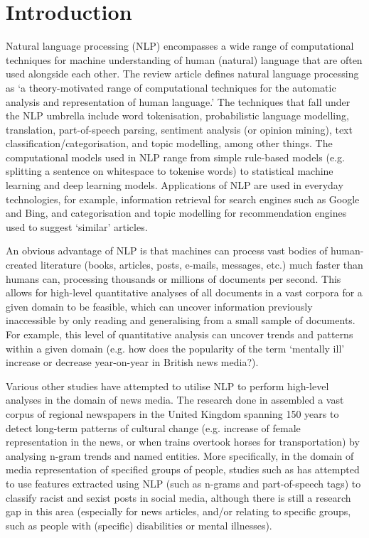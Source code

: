 \documentclass{report}
\begin{document}
\chapter{Introduction} \label{Introduction} %


Natural language processing (NLP) encompasses a wide range of computational techniques for machine understanding of human (natural) language that are often used alongside each other.
The review article \cite{cambria2014jumping} defines natural language processing as `a theory-motivated range of computational techniques for the automatic analysis and representation of human language.'
The techniques that fall under the NLP umbrella include word tokenisation, probabilistic language modelling, translation, part-of-speech parsing, sentiment analysis (or opinion mining), text classification/categorisation, and topic modelling, among other things. %
The computational models used in NLP range from simple rule-based models (e.g. splitting a sentence on whitespace to tokenise words) to statistical machine learning and deep learning models. 
Applications of NLP are used in everyday technologies, for example, information retrieval for search engines such as Google and Bing, and categorisation and topic modelling for recommendation engines used to suggest `similar' articles. %

An obvious advantage of NLP is that machines can process vast bodies of human-created literature (books, articles, posts, e-mails, messages, etc.) much faster than humans can, processing thousands or millions of documents per second. 
This allows for high-level quantitative analyses of all documents in a vast corpora for a given domain to be feasible, which can uncover information previously inaccessible by only reading and generalising from a small sample of documents.
For example, this level of quantitative analysis can uncover trends and patterns within a given domain (e.g. how does the popularity of the term `mentally ill' increase or decrease year-on-year in British news media?). 

Various other studies have attempted to utilise NLP to perform high-level analyses in the domain of news media.
The research done in \cite{lansdall2017content} assembled a vast corpus of regional newspapers in the United Kingdom spanning 150 years to detect long-term patterns of cultural change (e.g. increase of female representation in the news, or when trains overtook horses for transportation) by analysing n-gram trends and named entities. 
More specifically, in the domain of media representation of specified groups of people, studies such as \cite{waseem2016you} has attempted to use features extracted using NLP (such as n-grams and part-of-speech tags) to classify racist and sexist posts in social media, although there is still a research gap in this area (especially for news articles, and/or relating to specific groups, such as people with (specific) disabilities or mental illnesses).
\end{document}
